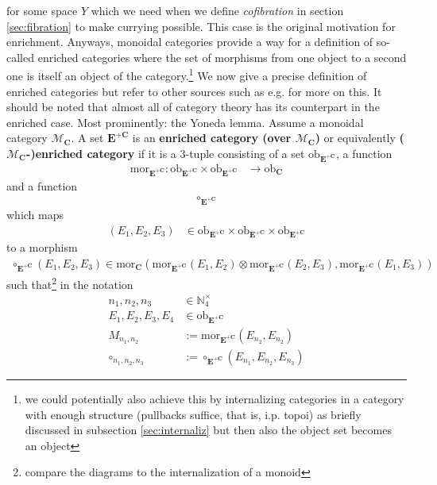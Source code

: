 for some space $Y$ which we need when we define \textit{cofibration} in section \ref{sec:fibration} to make currying possible. This case is the original motivation for enrichment. Anyways, monoidal categories provide a way for a definition of so-called enriched categories where the set of morphisms from one object to a second one is itself an object of the category.\footnote{we could potentially also achieve this by internalizing categories in a category with enough structure (pullbacks suffice, that is, i.p. topoi) as briefly discussed in subsection \ref{sec:internaliz} but then also the object set becomes an object} We now give a precise definition of enriched categories but refer to other sources such as e.g. \cite{00000020} for more on this. It should be noted that almost all of category theory has its counterpart in the enriched case. Most prominently: the Yoneda lemma. Assume a monoidal category $\mathcal{M}_{\mathbf{C}}$. A set $\mathbf{E}^{+\mathbf{C}}$ is an \textbf{enriched category (over $\mathcal{M}_{\mathbf{C}}$)} or equivalently \textbf{($\mathcal{M}_{\mathbf{C}}$-)enriched category} if it is a $3$-tuple consisting of a set $\mathrm{ob}_{\mathbf{E}^{+\mathbf{C}}}$, a function
\begin{align*}
  \mathrm{mor}_{\mathbf{E}^{+\mathbf{C}}}
  \colon
  \mathrm{ob}_{\mathbf{E}^{+\mathbf{C}}}
  \times
  \mathrm{ob}_{\mathbf{E}^{+\mathbf{C}}}
  &\rightarrow
  \mathrm{ob}_{\mathbf{C}}
\end{align*}
and a function
\begin{align*}
  \circ_{\mathbf{E}^{+\mathbf{C}}}
\end{align*}
which maps
\begin{align*}
  (E_{1},E_{2},E_{3})
  &\in
  \mathrm{ob}_{\mathbf{E}^{+\mathbf{C}}}
  \times
  \mathrm{ob}_{\mathbf{E}^{+\mathbf{C}}}
  \times
  \mathrm{ob}_{\mathbf{E}^{+\mathbf{C}}}
\end{align*}
to a morphism
\begin{align*}
  \circ_{\mathbf{E}^{+\mathbf{C}}}(E_{1},E_{2},E_{3})
  \in
  \mathrm{mor}_{\mathbf{C}}
  \left(
    \mathrm{mor}_{\mathbf{E}^{+\mathbf{C}}}(E_{1},E_{2})
    \otimes
    \mathrm{mor}_{\mathbf{E}^{+\mathbf{C}}}(E_{2},E_{3}),
    \mathrm{mor}_{\mathbf{E}^{+\mathbf{C}}}(E_{1},E_{3})
  \right)
\end{align*}
such that\footnote{compare the diagrams to the internalization of a monoid} in the notation
\begin{align*}
  n_{1},
  n_{2},
  n_{3}
  &\in
  \mathbb{N}_{4}^{\times}
  \\
  E_{1},
  E_{2},
  E_{3},
  E_{4}
  &\in
  \mathrm{ob}_{\mathbf{E}^{+\mathbf{C}}}
  \\
  M_{n_{1},n_{2}}
  &:=
  \mathrm{mor}_{\mathbf{E}^{+\mathbf{C}}}(E_{n_{2}},E_{n_{2}})
  \\
  \circ_{n_{1},n_{2},n_{3}}
  &:=
  \circ_{\mathbf{E}^{+\mathbf{C}}}(E_{n_{1}},E_{n_{2}},E_{n_{3}})
\end{align*}
